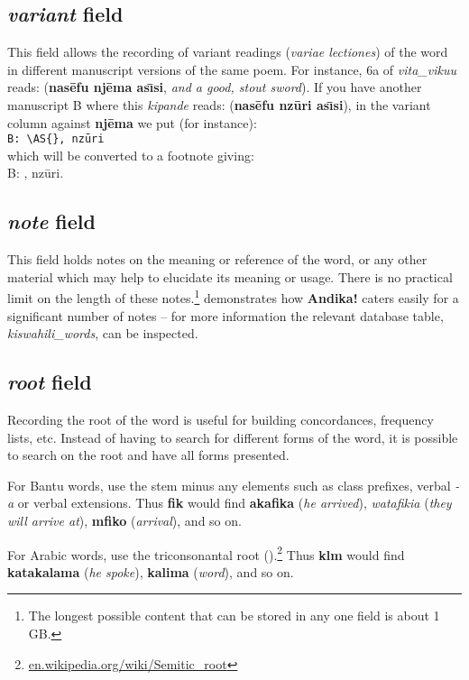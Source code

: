 \subsection{\textit{variant} field}

This field allows the recording of variant readings (\textit{variae lectiones}) of the word in different manuscript versions of the same poem.  For instance, 6a of \textit{vita_vikuu} reads:  (\textbf{nasēfu njēma ası̄si}, \textit{and a good, stout sword}).  If you have another manuscript B where this \textit{kipande} reads:  (\textbf{nasēfu nzūri ası̄si}), in the variant column against \textbf{njēma} we put (for instance):\\
\verb|B: \AS{|\texttt{}\verb|}, nzūri|\\
which will be converted to a footnote giving: \\
B: , nzūri.

\subsection{\textit{note} field}

This field holds notes on the meaning or reference of the word, or any other material which may help to elucidate its meaning or usage.  There is no practical limit on the length of these notes.\footnote{The longest possible content that can be stored in any one field is about 1 GB.}   demonstrates how \textbf{Andika!} caters easily for a significant number of notes -- for more information the relevant database table, \textit{kiswahili_words}, can be inspected.

\subsection{\textit{root} field}

Recording the root of the word is useful for building concordances, frequency lists, etc.  Instead of having to search for different forms of the word, it is possible to search on the root and have all forms presented.

For Bantu words, use the stem minus any elements such as class prefixes, verbal \textit{-a} or verbal extensions.  Thus \textbf{fik} would find \textbf{akafika} (\textit{he arrived}), \textit{watafikia} (\textit{they will arrive at}), \textbf{mfiko} (\textit{arrival}), and so on.

For Arabic words, use the triconsonantal root ().\footnote{\url{en.wikipedia.org/wiki/Semitic_root}}  Thus \textbf{klm} would find \textbf{katakalama} (\textit{he spoke}), \textbf{kalima} (\textit{word}), and so on.


